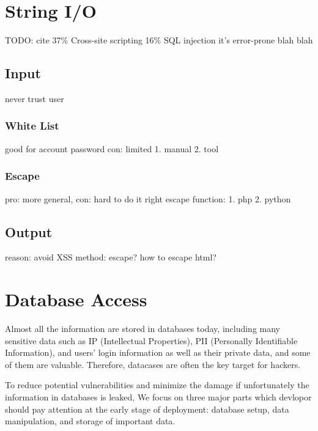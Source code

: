 \documentclass[conference]{IEEEtran}
\begin{document}
\section{String I/O}
TODO: cite
37\% Cross-site scripting
16\% SQL injection
it's error-prone
blah blah

\subsection{Input}
never trust user

\subsubsection{White List}
good for account password
con: limited
1. manual
2. tool

\subsubsection{Escape}
pro: more general,
con: hard to do it right
escape function:
1. php
2. python

\subsection{Output}
reason: avoid XSS
method: escape?
how to escape html?


\section{Database Access}
Almost all the information are stored in databases today,
including many sensitive data such as
IP (Intellectual Properties),
PII (Personally Identifiable Information),
and users' login information as well as their private data,
and some of them are valuable.
Therefore,
datacases are often the key target for hackers.

To reduce potential vulnerabilities
and minimize the damage if unfortunately the information in databases is leaked,
We focus on three major parts which devlopor should pay attention
at the early stage of deployment:
database setup, data manipulation, and storage of important data. %
\end{document}
